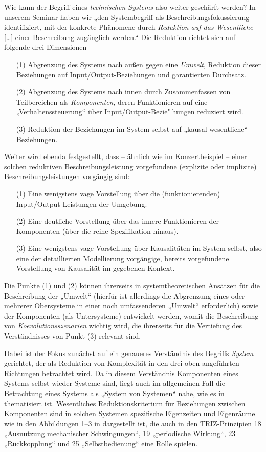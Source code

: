 \documentclass[11pt,a4paper]{article}
\begin{document}
Wie kann der Begriff eines \emph{technischen Systems} also weiter geschärft
werden?  In unserem Seminar \cite{Graebe2020} haben wir „den Systembegriff als
Beschreibungsfokussierung identifiziert, mit der konkrete Phänomene durch
\emph{Reduktion auf das Wesentliche} [\ldots] einer Beschreibung zugänglich
werden.“  Die Reduktion richtet sich auf folgende drei Dimensionen
\cite[S. 18]{Graebe2020} 
\begin{itemize}
\item [(1)] Abgrenzung des Systems nach außen gegen eine \emph{Umwelt},
  Reduktion dieser Beziehungen auf Input/Output-Beziehungen und garantierten
  Durchsatz.
\item [(2)] Abgrenzung des Systems nach innen durch Zusammenfassen von
  Teilbereichen als \emph{Komponenten}, deren Funktionieren auf eine
  „Verhaltenssteuerung“ über Input/Output-Bezie"|hungen reduziert wird.
\item [(3)] Reduktion der Beziehungen im System selbst auf „kausal
  wesentliche“ Beziehungen.
\end{itemize}
Weiter wird ebenda festgestellt, dass -- ähnlich wie im Konzertbeispiel --
einer solchen reduktiven Beschreibungsleistung vorgefundene (explizite oder
implizite) Beschreibungsleistungen vorgängig sind:
\begin{enumerate}
\item[(1)] Eine wenigstens vage Vorstellung über die (funktionierenden)
  Input/Output-Leistungen der Umgebung.
\item[(2)] Eine deutliche Vorstellung über das innere Funktionieren der
  Komponenten (über die reine Spezifikation hinaus).
\item[(3)] Eine wenigstens vage Vorstellung über Kausalitäten im System
  selbst, also eine der detaillierten Modellierung vorgängige, bereits
  vorgefundene Vorstellung von Kausalität im gegebenen Kontext.
\end{enumerate}
Die Punkte (1) und (2) können ihrerseits in systemtheoretischen Ansätzen für
die Beschreibung der „Umwelt“ (hierfür ist allerdings die Abgrenzung eines
oder mehrerer Obersysteme in einer noch umfassenderen „Umwelt“ erforderlich)
sowie der Komponenten (als Untersysteme) entwickelt werden, womit die
Beschreibung von \emph{Koevolutionsszenarien} wichtig wird, die ihrerseits für
die Vertiefung des Verständnisses von Punkt (3) relevant sind.

Dabei ist der Fokus zunächst auf ein genaueres Verständnis des Begriffs
\emph{System} gerichtet, der als Reduktion von Komplexität in den drei oben
angeführten Richtungen betrachtet wird. Da in diesem Verständnis Komponenten
eines Systems selbst wieder Systeme sind, liegt auch im allgemeinen Fall die
Betrachtung eines Systems als „System von Systemen“ nahe, wie es in
\cite{Holling2000} thematisiert ist.  Wesentliches Reduktionskriterium für
Beziehungen zwischen Komponenten sind in solchen Systemen spezifische
Eigenzeiten und Eigenräume wie in den Abbildungen 1--3 in \cite{Holling2000}
dargestellt ist, die auch in den TRIZ-Prinzipien 18 „Ausnutzung mechanischer
Schwingungen“, 19 „periodische Wirkung“, 23 „Rückkopplung“ und 25
„Selbstbedienung“ eine Rolle spielen. 
\end{document}

